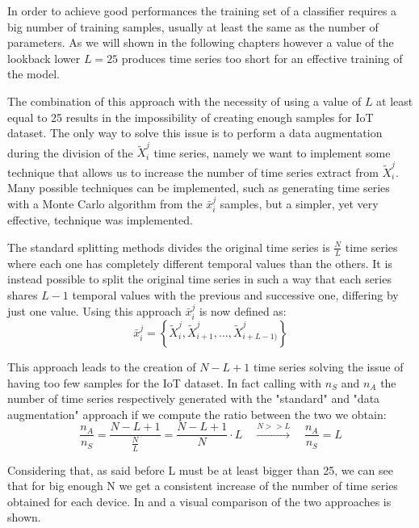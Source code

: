 In order to achieve good performances the training set of a classifier requires a big number of training samples, usually at least the same as the number of parameters. As we will shown in the following chapters however a value of the lookback lower $L=25$ produces time series too short for an effective training of the model. 

The combination of this approach with the necessity of using a value of $L$ at least equal to 25 results in the impossibility of creating enough samples for IoT dataset. The only way to solve this issue is to perform a data augmentation during the division of the ${\tilde{X}_i^j}$ time series, namely we want to implement some technique that allows us to increase the number of time series extract from ${\tilde{X}_i^j}$. Many possible techniques can be implemented, such as generating time series with a Monte Carlo algorithm from the $\bar{x}_i^j$ samples, but a simpler, yet very effective, technique was implemented.

The standard splitting methods divides the original time series is $\frac{N}{L}$ time series where each one has completely different temporal values than the others. It is instead possible to split the original time series in such a way that each series shares $L-1$ temporal values with the previous and successive one, differing by just one value. Using this approach $\bar{x}_i^j$
is now defined as:
\begin{equation}
    \bar{x}_i^j = \left\{\tilde{X}_{i}^j, \tilde{X}_{i +1 }^j, \dots, \tilde{X}_{i+L-1)}^j  \right\}
\end{equation}

This approach leads to the creation of $N-L+1$ time series solving the issue of having too few samples for the IoT dataset. In fact calling with $n_S$ and $n_A$ the number of time series respectively generated with the "standard" and "data augmentation" approach if we compute the ratio between the two we obtain:
\begin{equation}
    \frac{n_A}{n_S} = \frac{N-L+1}{\frac{N}{L}} = \frac{N-L+1}{N}\cdot L \quad \xrightarrow{N>>L}
    \quad \frac{n_A}{n_S}= L 
\end{equation}

Considering that, as said before L must be at least bigger than 25, we can see that for big enough N we get a consistent increase of the number of time series obtained for each device. In
 and  a visual comparison of the two approaches is shown.


